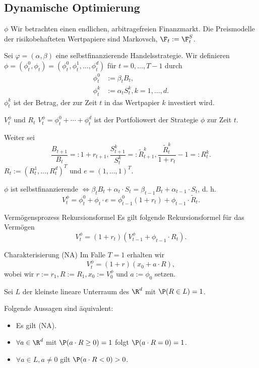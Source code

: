 \subsection{Dynamische Optimierung}

\begin{karte}{\(\phi\)}
Wir betrachten einen endlichen, arbitragefreien Finanzmarkt. Die Preismodelle 
der risikobehafteten Wertpapiere sind Markovsch, \(\F_t := \F_t^S\).

Sei \(\varphi = (\alpha, \beta)\) eine selbstfinanzierende Handelsstrategie. 
Wir definieren \(\phi = (\phi_t^0, \phi_t) = (\phi_t^0, \phi_t^1, \ldots, \phi_t^d)\) 
für \(t=0,\ldots, T-1\) durch 
\begin{align*}
    \phi_t^0 &:= \beta_t B_t,\\
    \phi_t^k &:= \alpha_t S_t^k, k = 1,\ldots, d.
\end{align*}
\(\phi_t^k\) ist der Betrag, der zur Zeit \(t\) in das Wertpapier \(k\) investiert wird.
\end{karte}

\begin{karte}{\(V_t^\phi\) und \(R_t\)}
\(V_t^\phi = \phi_t^0 + \cdots + \phi_t^d\) ist der Portfoliowert 
der Strategie \(\phi\) zur Zeit \(t\).

Weiter sei 
\[ \frac{B_{t+1}}{B_t} =: 1 + r_{t+1}, \frac{S_{t+1}^k}{S_t^k} =: \tilde{R}_{t+1}^k, \frac{\tilde{R}_t^k}{1 + r_t} - 1 =: R_t^k. \]
\(R_t := (R_t^1, \ldots, R_t^d)^T\) und \(e = (1, \ldots, 1)^T\). 

\(\phi\) ist selbstfinanzierende \(\Leftrightarrow \beta_t B_t + \alpha_t \cdot S_t 
= \beta_{t-1}B_t + \alpha_{t-1} \cdot S_t\), d. h. 
\[ V_t^\phi = \phi_t^0 + \phi_t \cdot e = \phi_{t-1}^0 ( 1 + r_t) + \phi_{t-1} \cdot \tilde{R}_t. \]
\end{karte}

\begin{karte}{Vermögensprozess Rekursionsformel}
Es gilt folgende Rekursionsformel für das Vermögen 
\[ V_t^\phi = (1+r_t)(V_{t-1}^\phi + \phi_{t-1} \cdot R_t). \]
\end{karte}

\begin{karte}{Charakterisierung (NA)}
Im Falle \(T=1\) erhalten wir 
\[ V_t^\phi = (1+r)(x_0 + a \cdot R), \]
wobei wir \(r := r_1, R := R_1, x_0 := V_0^\phi\) und \(a := \phi_0\) setzen.

Sei \(L\) der kleinste lineare Unterraum des \(\R^d\) mit 
\(\P(R \in L) = 1\).

Folgende Aussagen sind äquivalent: 
\begin{itemize}
    \item Es gilt (NA).
    \item \(\forall a \in \R^d\) mit \(\P(a\cdot R \geq 0) = 1\) folgt \(\P(a \cdot R = 0) = 1\).
    \item \(\forall a \in L, a\neq 0\) gilt \(\P(a \cdot R < 0) > 0\).
\end{itemize}
\end{karte}

